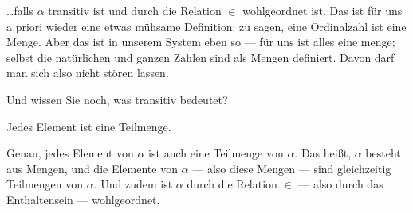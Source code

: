 \begin{math-stroke}

\end{math-stroke}

\begin{spoken-clean}[00:08:49 - 00:10:45]
\dots falls $\alpha$ transitiv ist und durch die Relation $\in$ wohlgeordnet ist. Das ist für uns a priori wieder eine etwas mühsame Definition: zu sagen, eine Ordinalzahl ist eine Menge. Aber das ist in unserem System eben so --- für uns ist alles eine menge; selbst die natürlichen und ganzen Zahlen sind als Mengen definiert. Davon darf man sich also nicht stören lassen.

Und wissen Sie noch, was transitiv bedeutet?
\end{spoken-clean}

\begin{student-interaction}[Studentenantwort]
Jedes Element ist eine Teilmenge.
\end{student-interaction}

\begin{spoken-clean}[00:10:45 - 00:11:11]
Genau, jedes Element von $\alpha$ ist auch eine Teilmenge von $\alpha$. Das heißt, $\alpha$ besteht aus Mengen, und die Elemente von $\alpha$ --- also diese Mengen --- sind gleichzeitig Teilmengen von $\alpha$. Und zudem ist $\alpha$ durch die Relation $\in$ --- also durch das Enthaltensein --- wohlgeordnet.
\end{spoken-clean}

